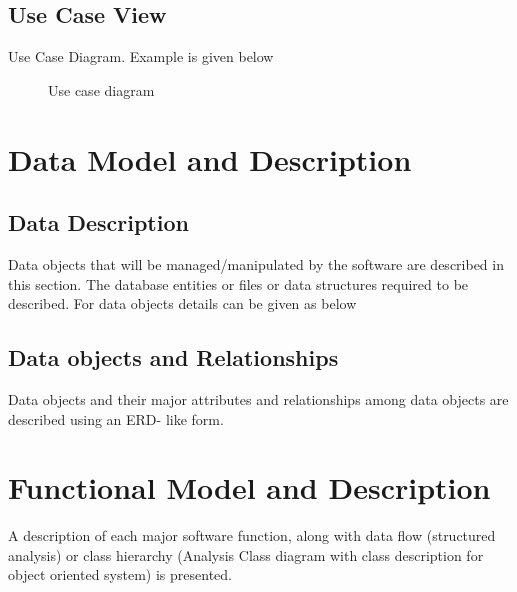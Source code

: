 \documentclass[oneside,a4paper,12pt]{report}
\begin{document}
\subsection{Use Case View}
Use Case Diagram. Example is given below
\begin{center}
	\begin{figure}[!htbp]
		\centering
	  \caption{Use case diagram}
	  \label{fig:usecase}
	\end{figure}
\end{center}  

\section{Data Model and Description}  
\subsection{Data Description}  
Data objects that will be managed/manipulated by the software are described in this section. The database entities or files or data structures  required to be described. For data objects details can be given as below
\subsection{Data objects and Relationships}
  Data objects and their major attributes and relationships among data objects are described using an ERD- like form.

 
 
\section{Functional Model and Description}  
A description of each major software function, along with data flow (structured analysis) or class hierarchy (Analysis Class diagram with class description for object oriented system) is presented. 
\end{document}
